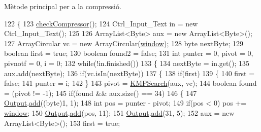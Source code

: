 Mètode principal per a la compressió. 


\begin{DoxyCode}
122     \{
123         \hyperlink{classdomini_1_1algorithm_1_1Algorithm_a070b7e7dcc453b03751d265beae5306c}{checkCompressor}();
124         Ctrl\_Input\_Text in = \textcolor{keyword}{new} Ctrl\_Input\_Text();
125 
126         ArrayList<Byte> aux = \textcolor{keyword}{new} ArrayList<Byte>();
127         ArrayCircular vc = \textcolor{keyword}{new} ArrayCircular(\hyperlink{classdomini_1_1algorithm_1_1LZSS_a00d9f2e9bc2baa39513fad040b8e7123}{window});
128         byte nextByte;
129         \textcolor{keywordtype}{boolean} first = \textcolor{keyword}{true};
130         \textcolor{keywordtype}{boolean} found2 = \textcolor{keyword}{false};
131         \textcolor{keywordtype}{int} punter = 0, pivot = 0, pivnotf = 0, i = 0;
132         \textcolor{keywordflow}{while}(!in.finished())
133         \{
134             nextByte = in.get();
135             aux.add(nextByte);
136             \textcolor{keywordflow}{if}(vc.isIn(nextByte))
137             \{
138                 \textcolor{keywordflow}{if}(first)
139                 \{
140                     first = \textcolor{keyword}{false};
141                     punter = i;
142                 \}
143                 pivot = \hyperlink{classdomini_1_1algorithm_1_1LZSS_a94b98f9eb4a4f60b9b773ecbf7fba276}{KMPSearch}(aux, vc);
144                 \textcolor{keywordtype}{boolean} found = (pivot != -1);
145                 \textcolor{keywordflow}{if}(found && aux.size() == 34)
146                 \{
147                     \hyperlink{classdomini_1_1algorithm_1_1Algorithm_a4de9955411c656325adc391ef570c082}{Output}.\hyperlink{classpersistencia_1_1output_1_1Ctrl__Output_a8c5aa5a6acb5259faeb1c05c71ddd21c}{add}((byte)1, 1);
148                     \textcolor{keywordtype}{int} pos = punter - pivot;
149                     \textcolor{keywordflow}{if}(pos < 0) pos += \hyperlink{classdomini_1_1algorithm_1_1LZSS_a00d9f2e9bc2baa39513fad040b8e7123}{window};
150                     \hyperlink{classdomini_1_1algorithm_1_1Algorithm_a4de9955411c656325adc391ef570c082}{Output}.\hyperlink{classpersistencia_1_1output_1_1Ctrl__Output_a8c5aa5a6acb5259faeb1c05c71ddd21c}{add}(pos, 11);
151                     \hyperlink{classdomini_1_1algorithm_1_1Algorithm_a4de9955411c656325adc391ef570c082}{Output}.\hyperlink{classpersistencia_1_1output_1_1Ctrl__Output_a8c5aa5a6acb5259faeb1c05c71ddd21c}{add}(31, 5);
152                     aux = \textcolor{keyword}{new} ArrayList<Byte>();
153                     first = \textcolor{keyword}{true};

\end{DoxyCode}
